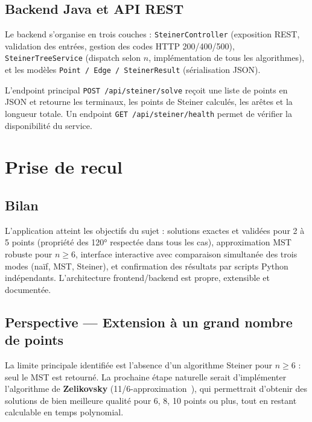 \documentclass[11pt, a4paper]{article}
\begin{document}
\subsection{Backend Java et API REST}

Le backend s'organise en trois couches : \texttt{SteinerController} (exposition REST,
validation des entrées, gestion des codes HTTP 200/400/500),
\texttt{SteinerTreeService} (dispatch selon $n$, implémentation de tous les algorithmes),
et les modèles \texttt{Point / Edge / SteinerResult} (sérialisation JSON).

L'endpoint principal \texttt{POST /api/steiner/solve} reçoit une liste de points en JSON
et retourne les terminaux, les points de Steiner calculés, les arêtes et la longueur totale.
Un endpoint \texttt{GET /api/steiner/health} permet de vérifier la disponibilité du service.

\section{Prise de recul}

\subsection{Bilan}

L'application atteint les objectifs du sujet : solutions exactes et validées pour 2 à 5 points
(propriété des 120° respectée dans tous les cas), approximation MST robuste pour $n \geq 6$,
interface interactive avec comparaison simultanée des trois modes (naïf, MST, Steiner),
et confirmation des résultats par scripts Python indépendants.
L'architecture frontend/backend est propre, extensible et documentée.

\subsection{Perspective — Extension à un grand nombre de points}

La limite principale identifiée est l'absence d'un algorithme Steiner pour $n \geq 6$ :
seul le MST est retourné. La prochaine étape naturelle serait d'implémenter
l'algorithme de \textbf{Zelikovsky} (11/6-approximation~\cite{zelikovsky1993}),
qui permettrait d'obtenir des solutions de bien meilleure qualité pour 6, 8, 10 points
ou plus, tout en restant calculable en temps polynomial.
\end{document}
